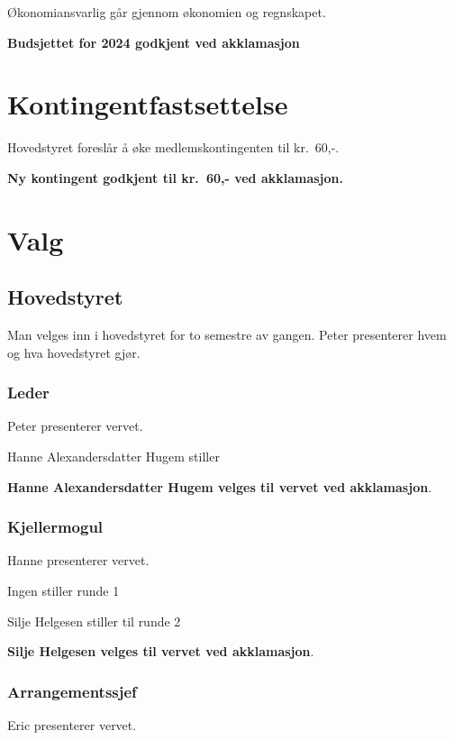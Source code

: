 \documentclass[10pt,norsk,a4paper,usenames,dvipsnames]{article}
\begin{document}
Økonomiansvarlig går gjennom økonomien og regnskapet. 

\textbf{Budsjettet for 2024 godkjent ved akklamasjon}

\section{Kontingentfastsettelse}
    Hovedstyret foreslår å øke medlemskontingenten til kr.~60,-.

\textbf{Ny kontingent godkjent til kr.~60,- ved akklamasjon.}

\section{Valg}

\begin{multicols}{2}
    
    \subsection{Hovedstyret}
        Man velges inn i hovedstyret for to semestre av gangen.
    Peter presenterer hvem og hva hovedstyret gjør.
        \subsubsection{Leder}
        Peter presenterer vervet. 

        Hanne Alexandersdatter Hugem stiller
        


        \textbf{Hanne Alexandersdatter Hugem velges til vervet ved akklamasjon}. 
        
        \subsubsection{Kjellermogul}
        Hanne presenterer vervet.

        Ingen stiller runde 1

        Silje Helgesen stiller til runde 2

        \textbf{Silje Helgesen velges til vervet ved akklamasjon}. 

        \subsubsection{Arrangementssjef}
        Eric presenterer vervet.


\end{multicols}
\end{document}
